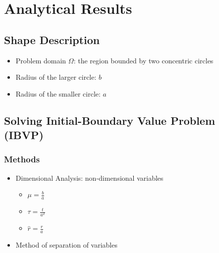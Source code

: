\label{appendix:method_validation_annulus}

\section{Analytical Results}

   \subsection{Shape Description}
     \begin{itemize}
      \item Problem domain $\Omega$: the region bounded by two concentric circles
      \item Radius of the larger circle: $b$
      \item Radius of the smaller circle: $a$
     \end{itemize}
     
   \subsection{Solving Initial-Boundary Value Problem (IBVP)}
     
     \subsubsection{Methods}

       \begin{itemize}
         \item  Dimensional Analysis: non-dimensional variables
            \begin{itemize}
              \item $\mu = \frac{b}{a}$
              \item $\tau = \frac{t}{a^2}$
              \item $\hat r = \frac{r}{a}$
            \end{itemize}
            
          \item Method of separation of variables
       \end{itemize}


